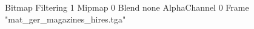 {Bitmap
	{Filtering 1}
	{Mipmap 0}
	{Blend none}
	{AlphaChannel 0}
	{Frame "mat_ger_magazines_hires.tga"}
}
